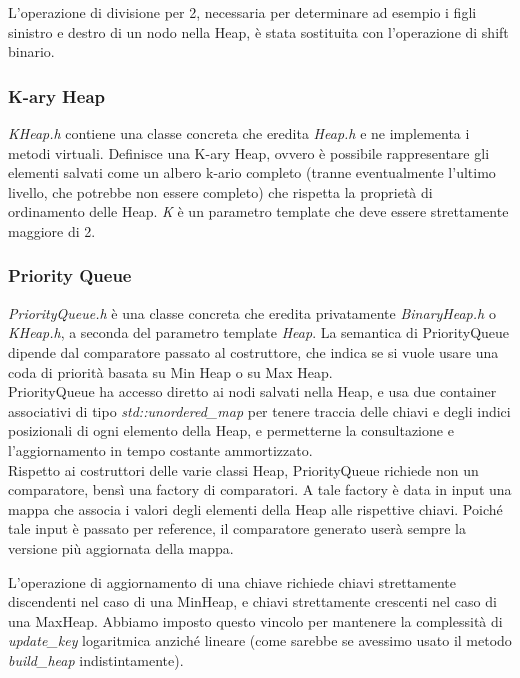 L'operazione di divisione per 2, necessaria per determinare ad esempio i figli sinistro e destro di un nodo nella Heap, è stata sostituita con l'operazione di shift binario.

\subsubsection{K-ary Heap}

\textit{KHeap.h} contiene una classe concreta che eredita \textit{Heap.h} e ne implementa i metodi virtuali. Definisce una K-ary Heap, ovvero è possibile rappresentare gli elementi salvati come un albero k-ario completo (tranne eventualmente l'ultimo livello, che potrebbe non essere completo) che rispetta la proprietà di ordinamento delle Heap.
\textit{K} è un parametro template che deve essere strettamente maggiore di 2.

\subsubsection{Priority Queue}

\textit{PriorityQueue.h} è una classe concreta che eredita privatamente \textit{BinaryHeap.h} o \textit{KHeap.h}, a seconda del parametro template \textit{Heap}.
La semantica di PriorityQueue dipende dal comparatore passato al costruttore, che indica se si vuole usare una coda di priorità basata su Min Heap o su Max Heap. \\

\noindent PriorityQueue ha accesso diretto ai nodi salvati nella Heap, e usa due container associativi di tipo \textit{std::unordered\_map} per tenere traccia
delle chiavi e degli indici posizionali di ogni elemento della Heap, e permetterne la consultazione e l'aggiornamento in tempo costante ammortizzato. \\

\noindent Rispetto ai costruttori delle varie classi Heap, PriorityQueue richiede non un comparatore, bensì una factory di comparatori. A tale factory è data in input una mappa che associa i valori degli elementi della Heap alle rispettive chiavi. Poiché tale input è passato per reference, il comparatore generato userà sempre la versione più aggiornata della mappa.

\noindent L'operazione di aggiornamento di una chiave richiede chiavi strettamente discendenti nel caso di una MinHeap, e chiavi strettamente crescenti nel caso di una MaxHeap. Abbiamo imposto questo vincolo per mantenere la complessità di \textit{update\_key} logaritmica anziché lineare (come sarebbe se avessimo usato il metodo \textit{build\_heap} indistintamente).

